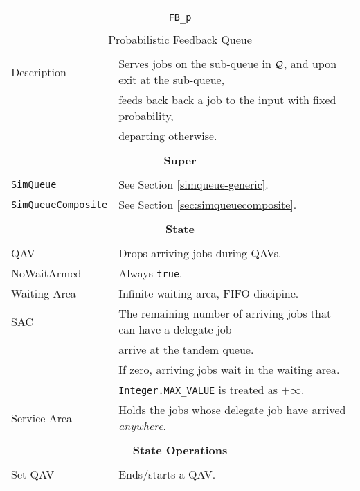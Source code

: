 \begin{tabular}{|l|l|}
	\hline
	\multicolumn{2}{|c|}{} \\
	\multicolumn{2}{|c|}{\lstinline[basicstyle=\large]{FB_p}} \\
	\multicolumn{2}{|c|}{} \\
	\multicolumn{2}{|c|}{Probabilistic Feedback Queue} \\
	\multicolumn{2}{|c|}{} \\
	\hline
	Description & Serves jobs on the sub-queue in $\cal{Q}$, and upon exit at the sub-queue, \\
	            & feeds back back a job to the input with fixed probability, \\
	            & departing otherwise. \\
	\hline
	\multicolumn{2}{|c|}{} \\
	\multicolumn{2}{|c|}{\bf Super} \\
	\multicolumn{2}{|c|}{} \\
	\hline
	\lstinline|SimQueue| & See Section \ref{simqueue-generic}. \\
	\lstinline|SimQueueComposite| & See Section \ref{sec:simqueuecomposite}. \\
	\hline
	\multicolumn{2}{|c|}{} \\
	\multicolumn{2}{|c|}{\bf State} \\
	\multicolumn{2}{|c|}{} \\
	\hline
	QAV & Drops arriving jobs during QAVs. \\
	\hline
	NoWaitArmed & Always \lstinline|true|. \\
	\hline
	Waiting Area & Infinite waiting area, FIFO discipine. \\
	\hline
	SAC & The remaining number of arriving jobs that can have a delegate job \\
	& arrive at the tandem queue. \\
	& If zero, arriving jobs wait in the waiting area. \\
	& \lstinline|Integer.MAX_VALUE| is treated as $+\infty$. \\
	\hline
	Service Area & Holds the jobs whose delegate job have arrived {\em anywhere}. \\
	\hline
	\multicolumn{2}{|c|}{} \\
	\multicolumn{2}{|c|}{\bf State Operations} \\
	\multicolumn{2}{|c|}{} \\
	\hline
	Set QAV & Ends/starts a QAV. \\
	\hline

\end{tabular}
